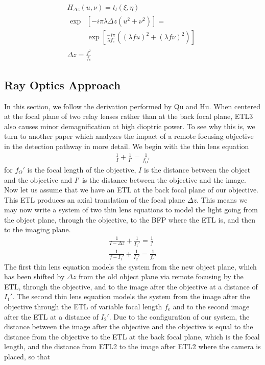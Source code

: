 \begin{gather} 
		H_{\Delta z}(u,\nu)=t_l(\xi, \eta) \\
		\begin{split}
		 \exp&\left[-i \pi \lambda \Delta z (u^2 + \nu^2)\right]= \\
		 &\exp\left[ \frac{-i \pi}{\lambda f_e}\left((\lambda f u)^2 + (\lambda f \nu)^2\right)\right]
		\end{split}\\
		\Delta z = \frac{f^2}{f_e}
\end{gather}


\subsection{Ray Optics Approach}
In this section, we follow the derivation performed by Qu and Hu. \cite{Qu} When centered at the focal plane of two relay lenses rather than at the back focal plane, ETL3 also causes minor demagnification at high dioptric power. To see why this is, we turn to another paper which analyzes the impact of a remote focusing objective in the detection pathway in more detail. We begin with the thin lens equation
\begin{gather}
	\frac{1}{I} + \frac{1}{I'} = \frac 1 {f_O'}
\end{gather}
for $f_O'$ is the focal length of the objective, $I$ is the distance between the object and the objective and $I'$ is the distance between the objective and the image. Now let us assume that we have an ETL at the back focal plane of our objective. This ETL produces an axial translation of the focal plane $\Delta z$. This means we may now write a system of two thin lens equations to model the light going from the object plane, through the objective, to the BFP where the ETL is, and then to the imaging plane.
\begin{gather}
	\frac{1}{I-\Delta z} + \frac{1}{I_1'}  = \frac 1{f}\\
	\frac{1}{f -I_1'}+\frac{1}{I_2'} = \frac{1}{f_e'}
\end{gather}
The first thin lens equation models the system from the new object plane, which has been shifted by $\Delta z$ from the old object plane via remote focusing by the ETL, through the objective, and to the image after the objective at a distance of $I_1'$. The second thin lens equation models the system from the image after the objective through the ETL of variable focal length $f_e$ and to the second image after the ETL at a distance of $I_2'$. Due to the configuration of our system, the distance between the image after the objective and the objective is equal to the distance from the objective to the ETL at the back focal plane, which is the focal length, and the distance from ETL2 to the image after ETL2 where the camera is placed, so that
